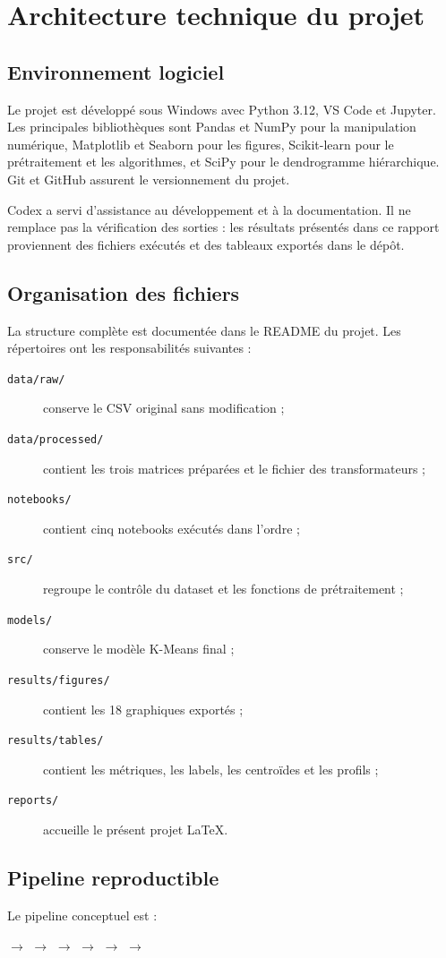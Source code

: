 \chapter{Architecture technique du projet}

\section{Environnement logiciel}
Le projet est développé sous Windows avec Python 3.12, VS Code et Jupyter. Les principales bibliothèques sont Pandas et NumPy pour la manipulation numérique, Matplotlib et Seaborn pour les figures, Scikit-learn pour le prétraitement et les algorithmes, et SciPy pour le dendrogramme hiérarchique. Git et GitHub assurent le versionnement du projet.

Codex a servi d'assistance au développement et à la documentation. Il ne remplace pas la vérification des sorties : les résultats présentés dans ce rapport proviennent des fichiers exécutés et des tableaux exportés dans le dépôt.

\section{Organisation des fichiers}
La structure complète est documentée dans le README du projet. Les répertoires ont les responsabilités suivantes :
\begin{description}
  \item[\texttt{data/raw/}] conserve le CSV original sans modification ;
  \item[\texttt{data/processed/}] contient les trois matrices préparées et le fichier des transformateurs ;
  \item[\texttt{notebooks/}] contient cinq notebooks exécutés dans l'ordre ;
  \item[\texttt{src/}] regroupe le contrôle du dataset et les fonctions de prétraitement ;
  \item[\texttt{models/}] conserve le modèle K-Means final ;
  \item[\texttt{results/figures/}] contient les 18 graphiques exportés ;
  \item[\texttt{results/tables/}] contient les métriques, les labels, les centroïdes et les profils ;
  \item[\texttt{reports/}] accueille le présent projet LaTeX.
\end{description}

\section{Pipeline reproductible}
Le pipeline conceptuel est :
\begin{center}
 $\rightarrow$  $\rightarrow$  $\rightarrow$  $\rightarrow$  $\rightarrow$  $\rightarrow$ 
\end{center}

